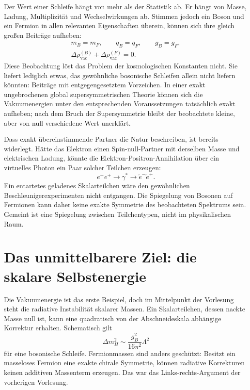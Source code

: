 Der Wert einer Schleife hängt von mehr als der Statistik ab. Er hängt von Masse, Ladung, Multiplizität und Wechselwirkungen ab. Stimmen jedoch ein Boson und ein Fermion in allen relevanten Eigenschaften überein, können sich ihre gleich großen Beiträge aufheben:
\begin{equation}
\begin{gathered}
m_B=m_F,\qquad q_B=q_F,\qquad g_B=g_F,\\
\Delta\rho_{\mathrm{vac}}^{(B)}
+\Delta\rho_{\mathrm{vac}}^{(F)}=0.
\end{gathered}
\end{equation}
Diese Beobachtung löst das Problem der kosmologischen Konstanten nicht. Sie liefert lediglich etwas, das gewöhnliche bosonische Schleifen allein nicht liefern könnten: Beiträge mit entgegengesetztem Vorzeichen. In einer exakt ungebrochenen global supersymmetrischen Theorie können sich die Vakuumenergien unter den entsprechenden Voraussetzungen tatsächlich exakt aufheben; nach dem Bruch der Supersymmetrie bleibt der beobachtete kleine, aber von null verschiedene Wert unerklärt.

Dass exakt übereinstimmende Partner die Natur beschreiben, ist bereits widerlegt. Hätte das Elektron einen Spin-null-Partner mit derselben Masse und elektrischen Ladung, könnte die Elektron-Positron-Annihilation über ein virtuelles Photon ein Paar solcher Teilchen erzeugen:
\begin{equation}
e^-e^+\longrightarrow\gamma^*
\longrightarrow\widetilde e^-\widetilde e^+.
\end{equation}
Ein entartetes geladenes Skalarteilchen wäre den gewöhnlichen Beschleunigerexperimenten nicht entgangen. Die Spiegelung von Bosonen auf Fermionen kann daher keine exakte Symmetrie des beobachteten Spektrums sein. Gemeint ist eine Spiegelung zwischen Teilchentypen, nicht im physikalischen Raum.

\section{Das unmittelbarere Ziel: die skalare Selbstenergie}

Die Vakuumenergie ist das erste Beispiel, doch im Mittelpunkt der Vorlesung steht die radiative Instabilität skalarer Massen. Ein Skalarteilchen, dessen nackte Masse null ist, kann eine quadratisch von der Abschneideskala abhängige Korrektur erhalten. Schematisch gilt
\begin{equation}
\Delta m_H^2\sim \frac{g_B^2}{16\pi^2}\Lambda^2
\end{equation}
für eine bosonische Schleife. Fermionmassen sind anders geschützt: Besitzt ein masseloses Fermion eine exakte chirale Symmetrie, können radiative Korrekturen keinen additiven Massenterm erzeugen. Das war das Links-rechts-Argument der vorherigen Vorlesung.

